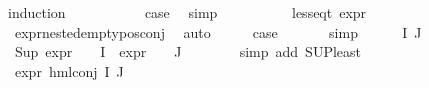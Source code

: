 \begin{isabellebody}
\isamarkupfalse%
{\isacharparenleft}{\kern0pt}induction\ {\isasymphi}{\isacharparenright}{\kern0pt}\isanewline
\ \ \isamarkupfalse%
\ {}\isanewline
\ \ \isamarkupfalse%
\ \isamarkupfalse%
\ {\isacharquery}{\kern0pt}case\ \isamarkupfalse%
\ simp\isanewline
{}\isamarkupfalse%
\isanewline
\ \ \isamarkupfalse%
\ {\isacharparenleft}{\kern0pt}{}\ {\isasympsi}\ {\isasymalpha}{\isacharparenright}{\kern0pt}\isanewline
\ \ \isamarkupfalse%
\ {\isachardoublequoteopen}less{\isacharunderscore}{\kern0pt}eq{\isacharunderscore}{\kern0pt}t\ {\isacharparenleft}{\kern0pt}expr\ {\isasympsi}{\isacharparenright}{\kern0pt}\ {\isacharparenleft}{\kern0pt}{}{\isacharcomma}{\kern0pt}\ {\isasyminfinity}{\isacharcomma}{\kern0pt}\ {}{\isacharcomma}{\kern0pt}\ {}{\isacharcomma}{\kern0pt}\ {}{\isacharcomma}{\kern0pt}\ {}{\isacharparenright}{\kern0pt}{\isachardoublequoteclose}\isanewline
\ \ \ \ \isamarkupfalse%
\ expr{\isacharunderscore}{\kern0pt}nested{\isacharunderscore}{\kern0pt}empty{\isacharunderscore}{\kern0pt}pos{\isacharunderscore}{\kern0pt}conj\ \isamarkupfalse%
\ auto\isanewline
\ \ \isamarkupfalse%
\ \isamarkupfalse%
\ {\isacharquery}{\kern0pt}case\ \isanewline
\ \ \ \ \isamarkupfalse%
\ simp\isanewline
{}\isamarkupfalse%
\isanewline
\ \ \isamarkupfalse%
\ {\isacharparenleft}{\kern0pt}{}\ {\isasymPhi}\ I\ J{\isacharparenright}{\kern0pt}\isanewline
\ \ \isamarkupfalse%
\ {\isachardoublequoteopen}Sup\ {\isacharparenleft}{\kern0pt}{\isacharparenleft}{\kern0pt}expr{\isacharunderscore}{\kern0pt}{}\ {\isasymcirc}\ {\isasymPhi}{\isacharparenright}{\kern0pt}\ {\isacharbackquote}{\kern0pt}\ I\ {\isasymunion}\ {\isacharparenleft}{\kern0pt}expr{\isacharunderscore}{\kern0pt}{}\ {\isasymcirc}\ {\isasymPhi}{\isacharparenright}{\kern0pt}\ {\isacharbackquote}{\kern0pt}\ J{\isacharparenright}{\kern0pt}\ {\isasymle}\ {}{\isachardoublequoteclose}\isanewline
\ \ \ \ \isamarkupfalse%
\ {\isacharparenleft}{\kern0pt}simp\ add{\isacharcolon}{\kern0pt}\ SUP{\isacharunderscore}{\kern0pt}least{\isacharparenright}{\kern0pt}\isanewline
\ \ \isamarkupfalse%
\ {\isachardoublequoteopen}expr{\isacharunderscore}{\kern0pt}{}\ {\isacharparenleft}{\kern0pt}hml{\isacharunderscore}{\kern0pt}conj\ I\ J\ {\isasymPhi}{\isacharparenright}{\kern0pt}\ {\isasymle}\ {}{\isachardoublequoteclose}\isanewline

\end{isabellebody}
